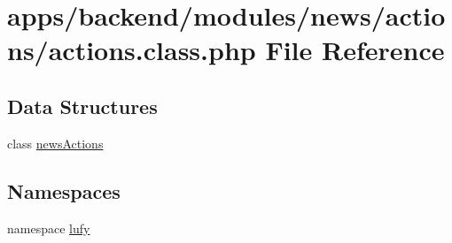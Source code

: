\hypertarget{backend_2modules_2news_2actions_2actions_8class_8php}{\section{apps/backend/modules/news/actions/actions.class.\-php File Reference}
\label{backend_2modules_2news_2actions_2actions_8class_8php}
}
\subsection*{Data Structures}
\begin{DoxyCompactItemize}
\item 
class \hyperlink{classnews_actions}{news\-Actions}
\end{DoxyCompactItemize}
\subsection*{Namespaces}
\begin{DoxyCompactItemize}
\item 
namespace \hyperlink{namespacelufy}{lufy}
\end{DoxyCompactItemize}
